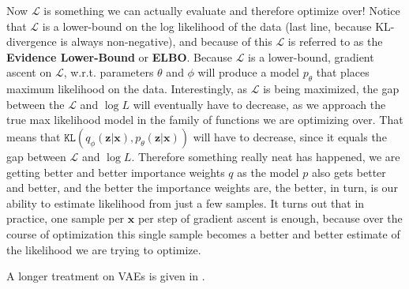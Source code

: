 Now $\mathcal{L}$ is something we can actually evaluate and therefore optimize over! Notice that $\mathcal{L}$ is a lower-bound on the log likelihood of the data (last line, because KL-divergence is always non-negative), and because of this $\mathcal{L}$ is referred to as the {\bf Evidence Lower-Bound} or {\bf ELBO}. Because $\mathcal{L}$ is a lower-bound, gradient ascent on $\mathcal{L}$, w.r.t. parameters $\theta$ and $\phi$ will produce a model $p_{\theta}$ that places maximum likelihood on the data. Interestingly, as $\mathcal{L}$ is being maximized, the gap between the $\mathcal{L}$ and $\log L$ will eventually have to decrease, as we approach the true max likelihood model in the family of functions we are optimizing over. That means that $\texttt{KL}(q_{\phi}(\mathbf{z}|\mathbf{x}), p_{\theta}(\mathbf{z}|\mathbf{x}))$ will have to decrease, since it equals the gap between $\mathcal{L}$ and $\log L$. Therefore something really neat has happened, we are getting better and better importance weights $q$ as the model $p$ also gets better and better, and the better the importance weights are, the better, in turn, is our ability to estimate likelihood from just a few samples. It turns out that in practice, one sample per $\mathbf{x}$ per step of gradient ascent is enough, because over the course of optimization this single sample becomes a better and better estimate of the likelihood we are trying to optimize.

A longer treatment on VAEs is given in \cite{doersch2016tutorial}.




